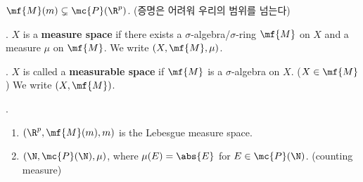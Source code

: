 \rmk \(\mf{M}(m) \subsetneq \mc{P}(\R^p)\). (증명은 어려워 우리의 범위를 넘는다)

.  \(X\) is a \textbf{measure space} if there exists a \(\sigma\)-algebra/\(\sigma\)-ring \(\mf{M}\) on \(X\) and a measure \(\mu\) on \(\mf{M}\). We write \((X, \mf{M}, \mu)\).

.  \(X\) is called a \textbf{measurable space} if \(\mf{M}\) is a \(\sigma\)-algebra on \(X\). (\(X \in \mf{M}\)) We write \((X, \mf{M})\).

\ex.
\begin{enumerate}
    \item \((\R^p, \mf{M}(m), m)\) is the Lebesgue measure space.
    \item \((\N, \mc{P}(\N), \mu)\), where \(\mu(E) = \abs{E}\) for \(E \in \mc{P}(\N)\). (counting measure)
\end{enumerate}

\pagebreak
